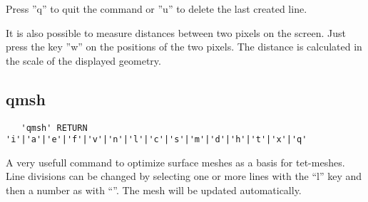 \documentclass{article}
\begin{document}
Press ''q'' to quit the command or ''u'' to delete the last created line.

It is also possible to measure distances between two pixels on the screen. Just press the key ''w'' on the positions of the two pixels. The distance is calculated in the scale of the displayed geometry.

\subsection{\label{qmsh}qmsh}
\begin{verbatim}
   'qmsh' RETURN 'i'|'a'|'e'|'f'|'v'|'n'|'l'|'c'|'s'|'m'|'d'|'h'|'t'|'x'|'q'
\end{verbatim}
A very usefull command to optimize surface meshes as a basis for tet-meshes. Line divisions can be changed by selecting one or more lines with the ``l'' key and then a number as with ``''. The mesh will be updated automatically.
\end{document}

